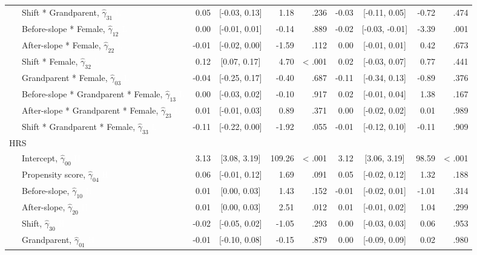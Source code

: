 \documentclass[
  english,
  man, noextraspace,floatsintext]{apa7}
\newenvironment{lltable}{\begin{landscape}\begin{center}\begin{ThreePartTable}}{\end{ThreePartTable}\end{center}\end{landscape}}
\begin{document}
\begin{appendix}
\begin{lltable}
{\begin{longtable}{lrcrrrcrr}
\ \ \ Shift * Grandparent, $\hat{\gamma}_{31}$ \textcolor{white}{L} & 0.05 & {}[-0.03, 0.13] & 1.18 & .236 & -0.03 & {}[-0.11, 0.05] & -0.72 & .474\\
\ \ \ Before-slope * Female, $\hat{\gamma}_{12}$ \textcolor{white}{L} & 0.00 & {}[-0.01, 0.01] & -0.14 & .889 & -0.02 & {}[-0.03, -0.01] & -3.39 & .001\\
\ \ \ After-slope * Female, $\hat{\gamma}_{22}$ \textcolor{white}{L} & -0.01 & {}[-0.02, 0.00] & -1.59 & .112 & 0.00 & {}[-0.01, 0.01] & 0.42 & .673\\
\ \ \ Shift * Female, $\hat{\gamma}_{32}$ \textcolor{white}{L} & 0.12 & {}[0.07, 0.17] & 4.70 & < .001 & 0.02 & {}[-0.03, 0.07] & 0.77 & .441\\
\ \ \ Grandparent * Female, $\hat{\gamma}_{03}$ \textcolor{white}{L} & -0.04 & {}[-0.25, 0.17] & -0.40 & .687 & -0.11 & {}[-0.34, 0.13] & -0.89 & .376\\
\ \ \ Before-slope * Grandparent * Female, $\hat{\gamma}_{13}$ \textcolor{white}{L} & 0.00 & {}[-0.03, 0.02] & -0.10 & .917 & 0.02 & {}[-0.01, 0.04] & 1.38 & .167\\
\ \ \ After-slope * Grandparent * Female, $\hat{\gamma}_{23}$ \textcolor{white}{L} & 0.01 & {}[-0.01, 0.03] & 0.89 & .371 & 0.00 & {}[-0.02, 0.02] & 0.01 & .989\\
\ \ \ Shift * Grandparent * Female, $\hat{\gamma}_{33}$ \textcolor{white}{L} & -0.11 & {}[-0.22, 0.00] & -1.92 & .055 & -0.01 & {}[-0.12, 0.10] & -0.11 & .909\\
HRS &  &  &  &  &  &  &  & \\
\ \ \ Intercept, $\hat{\gamma}_{00}$ \textcolor{white}{H} & 3.13 & {}[3.08, 3.19] & 109.26 & < .001 & 3.12 & {}[3.06, 3.19] & 98.59 & < .001\\
\ \ \ Propensity score, $\hat{\gamma}_{04}$ \textcolor{white}{H} & 0.06 & {}[-0.01, 0.12] & 1.69 & .091 & 0.05 & {}[-0.02, 0.12] & 1.32 & .188\\
\ \ \ Before-slope, $\hat{\gamma}_{10}$ \textcolor{white}{H} & 0.01 & {}[0.00, 0.03] & 1.43 & .152 & -0.01 & {}[-0.02, 0.01] & -1.01 & .314\\
\ \ \ After-slope, $\hat{\gamma}_{20}$ \textcolor{white}{H} & 0.01 & {}[0.00, 0.03] & 2.51 & .012 & 0.01 & {}[-0.01, 0.02] & 1.04 & .299\\
\ \ \ Shift, $\hat{\gamma}_{30}$ \textcolor{white}{H} & -0.02 & {}[-0.05, 0.02] & -1.05 & .293 & 0.00 & {}[-0.03, 0.03] & 0.06 & .953\\
\ \ \ Grandparent, $\hat{\gamma}_{01}$ \textcolor{white}{H} & -0.01 & {}[-0.10, 0.08] & -0.15 & .879 & 0.00 & {}[-0.09, 0.09] & 0.02 & .980\\

\end{longtable}}
\end{lltable}
\end{appendix}
\end{document}
